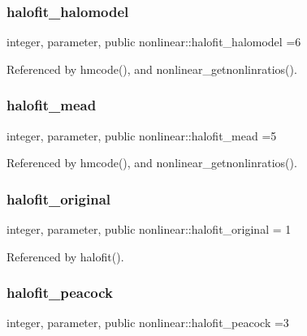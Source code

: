 \subsubsection{\texorpdfstring{halofit\+\_\+halomodel}{halofit\_halomodel}}
{\footnotesize\ttfamily integer, parameter, public nonlinear\+::halofit\+\_\+halomodel =6}



Referenced by hmcode(), and nonlinear\+\_\+getnonlinratios().

\mbox{\label{namespacenonlinear_a321ebd41ef62b8c5f49c902695c97100}} 
\subsubsection{\texorpdfstring{halofit\+\_\+mead}{halofit\_mead}}
{\footnotesize\ttfamily integer, parameter, public nonlinear\+::halofit\+\_\+mead =5}



Referenced by hmcode(), and nonlinear\+\_\+getnonlinratios().

\mbox{\label{namespacenonlinear_a7df6fbf986bfffb1410f611a9d9da8d8}} 
\subsubsection{\texorpdfstring{halofit\+\_\+original}{halofit\_original}}
{\footnotesize\ttfamily integer, parameter, public nonlinear\+::halofit\+\_\+original = 1}



Referenced by halofit().

\mbox{\label{namespacenonlinear_af6d944f360abde474ac917e61cc9a10a}} 
\subsubsection{\texorpdfstring{halofit\+\_\+peacock}{halofit\_peacock}}
{\footnotesize\ttfamily integer, parameter, public nonlinear\+::halofit\+\_\+peacock =3}



